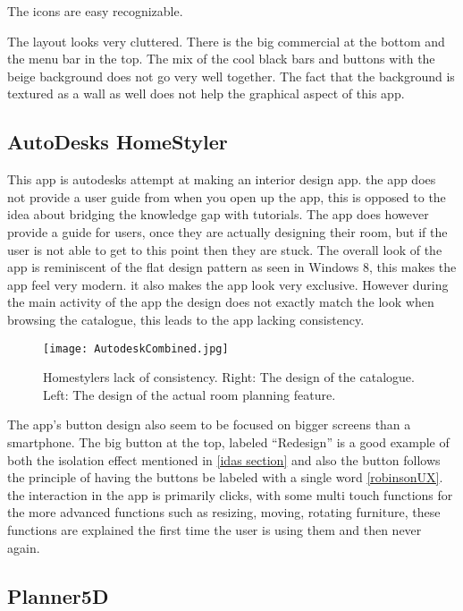 The icons are easy recognizable.  

The layout looks very cluttered. There is the big commercial at the bottom and the menu bar in the top. 
The mix of the cool black bars and buttons with the beige background does not go very well together. The fact that the background is textured as a wall as well does not help the graphical aspect of this app. 

\subsection{AutoDesks HomeStyler}
This app is autodesks attempt at making an interior design app. the app does not provide a user  guide  from when you open up the app, this is opposed to the idea about bridging the knowledge gap with tutorials. The app does 
however provide a guide for users, once they are actually designing their room, but if the user is not able to get 
to this point then they are stuck. The overall look of the app is reminiscent of the flat design pattern as seen 
in Windows 8, this makes the app feel very modern. it also makes the app look very exclusive. However during the 
main activity of the app the design does not exactly match the look when browsing the catalogue, this leads to the 
app lacking consistency. 

\begin{figure}[H]
\centering
\texttt{[image: AutodeskCombined.jpg]}
\caption{Homestylers lack of consistency. Right: The design of the catalogue. Left: The design of the actual room planning feature.}
\end{figure}

The app’s button design also seem to be focused on bigger screens than a smartphone. The 
big button at the top, labeled “Redesign” is a good example of both the isolation effect mentioned in \ref{idas 
section} and also the button follows the principle of having the buttons be labeled with a single word 
\ref{robinsonUX}. the interaction in the app is primarily clicks, with some multi touch functions for the more 
advanced functions such as resizing, moving, rotating furniture, these functions are explained the first time the 
user is using them and then never again.

\subsection{Planner5D}

